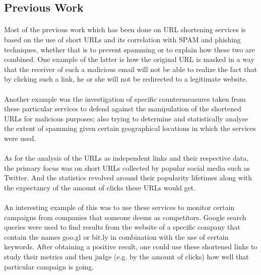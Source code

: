 \documentclass[12pt]{article}
\begin{document}
\subsection{Previous Work}

\paragraph{}
Most of the previous work which has been done on URL shortening services is based on the use of short URLs and its correlation with SPAM and phishing techniques, whether that is to prevent spamming or to explain how these two are combined. One example of the latter is how the original URL is masked in a way that the receiver of such a malicious email will not be able to realize the fact that by clicking such a link, he or she will not be redirected to a legitimate website.
 
\paragraph{}
Another example was the investigation of specific countermeasures taken from these particular services to defend against the manipulation of the shortened URLs for malicious purposes; also trying to determine and statistically analyse the extent of spamming given certain geographical locations in which the services were used.

\paragraph{}
 As for the analysis of the URLs as independent links and their respective data, the primary focus was on short URLs collected by popular social media such as Twitter. And the statistics revolved around their popularity lifetimes along with the expectancy of the amount of clicks these URLs would get.
 
\paragraph{}
 An interesting example of this was to use these services to monitor certain campaigns from companies that someone deems as competitors. Google search queries were used to find results from the website of a specific company that contain the names goo.gl or bit.ly in combination with the use of certain keywords. After obtaining a positive result, one could use these shortened links to study their metrics and then judge (e.g. by the amount of clicks) how well that particular campaign is going.
\end{document}
